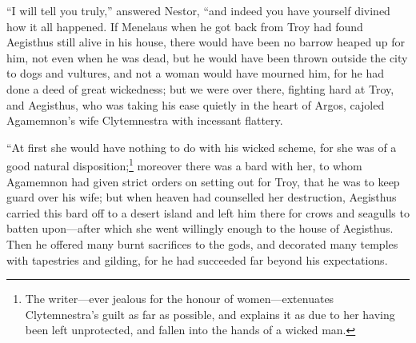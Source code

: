“I will tell you truly,” answered Nestor, “and indeed you have yourself divined
how it all happened. If Menelaus when he got back from Troy had found Aegisthus
still alive in his house, there would have been no barrow heaped up for him,
not even when he was dead, but he would have been thrown outside the city to
dogs and vultures, and not a woman would have mourned him, for he had done a
deed of great wickedness; but we were over there, fighting hard at Troy, and
Aegisthus, who was taking his ease quietly in the heart of Argos, cajoled
Agamemnon’s wife Clytemnestra with incessant flattery.

“At first she would have nothing to do with his wicked scheme, for she was of a
good natural disposition;\footnote{The writer—ever jealous for the honour of women—extenuates Clytemnestra’s
guilt as far as possible, and explains it as due to her having been left
unprotected, and fallen into the hands of a wicked man.} moreover there was a bard with her,
to whom Agamemnon had given strict orders on setting out for Troy, that he was
to keep guard over his wife; but when heaven had counselled her destruction,
Aegisthus carried this bard off to a desert island and left him there for crows
and seagulls to batten upon—after which she went willingly enough to the house
of Aegisthus. Then he offered many burnt sacrifices to the gods, and decorated
many temples with tapestries and gilding, for he had succeeded far beyond his
expectations.

